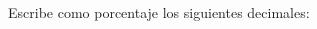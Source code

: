\documentclass[12pt,addpoints]{evalua}
\begin{document}
\begin{questions}
    \begin{multicols}{3}
    \end{multicols}


    \question[6] Escribe como porcentaje los siguientes decimales:

    \begin{multicols}{3}
    \end{multicols}



\end{questions}
\end{document}
